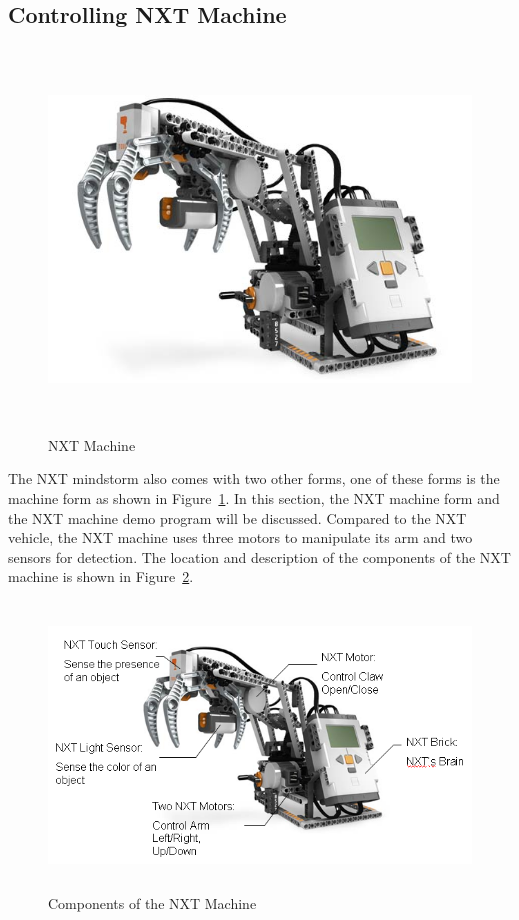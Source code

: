 \documentclass[11pt]{article}
\begin{document}
\subsection{Controlling NXT Machine}
\begin{figure}[h]
  \begin{center}
    \includegraphics[height=4in]{figure/mindstorm/NXT_machine.png}
    \caption{NXT Machine\label{fig_NXT_machine}}
  \end{center}
\end{figure}
The NXT mindstorm also comes with two other forms, one of these forms is the machine form as 
shown in Figure~\ref{fig_NXT_machine}. In this section, the NXT machine form and the NXT machine 
demo program will be discussed. Compared to the NXT vehicle, the NXT machine uses three motors 
to manipulate its arm and two sensors for detection. The location and description of the components 
of the NXT machine is shown in Figure~\ref{fig_NXT_machineMOD}.
\newpage
\begin{figure}[h]
  \begin{center}
      \includegraphics[height = 3in]{figure/mindstorm/NXT_machineMOD.png}
    \caption{Components of the NXT Machine\label{fig_NXT_machineMOD}}
  \end{center}
\end{figure}
\end{document}
